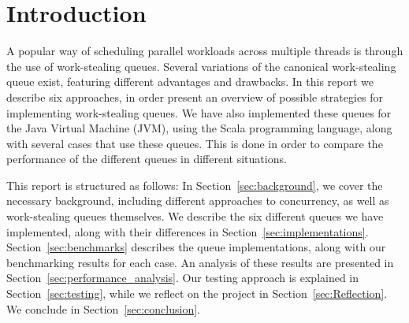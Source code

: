 \section{Introduction}
\label{sec:introduction}
A popular way of scheduling parallel workloads across multiple threads is through the use of work-stealing queues. 
Several variations of the canonical work-stealing queue exist, featuring different advantages and drawbacks.
In this report we describe six approaches, in order present an overview of possible strategies for implementing work-stealing queues.
We have also implemented these queues for the Java Virtual Machine (JVM), using the Scala programming language, along with several cases that use these queues.
This is done in order to compare the performance of the different queues in different situations. 

This report is structured as follows: In Section~\ref{sec:background}, we cover
the necessary background, including different approaches to concurrency, as well
as work-stealing queues themselves. We
describe the six different queues we have implemented, along with their
differences in Section~\ref{sec:implementations}. Section~\ref{sec:benchmarks} describes the queue implementations, along with our benchmarking results for each case. An analysis of
these results are presented in Section~\ref{sec:performance_analysis}. Our
testing approach is explained in Section~\ref{sec:testing}, while we reflect
on the project in Section~\ref{sec:Reflection}. We conclude in 
Section~\ref{sec:conclusion}.
